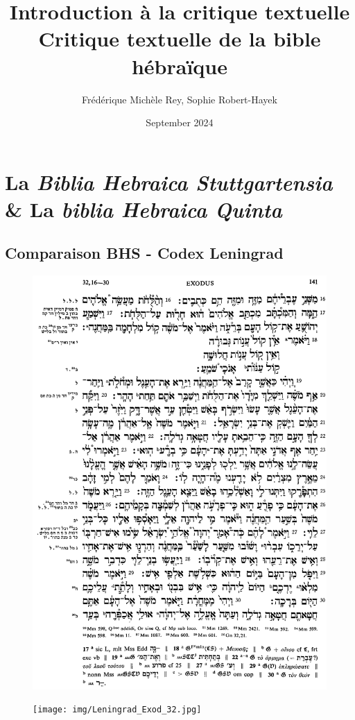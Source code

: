 \documentclass[11pt,a4paper]{article}
\title{Introduction à la critique textuelle\\Critique textuelle de la bible hébraïque}
\author{Frédérique Michèle Rey, Sophie Robert-Hayek}
\date{September 2024}
\begin{document}
\maketitle
\justifying

\section{La \textit{Biblia Hebraica Stuttgartensia} \& La \textit{biblia Hebraica Quinta}}

\subsection{Comparaison BHS - Codex Leningrad}
\begin{figure}[!h]
    \centering
\includegraphics[width=.6\linewidth]{img/BHS_Exod_32.png}
\end{figure}
\newpage
\begin{figure}[!h]
    \centering
\texttt{[image: img/Leningrad\_Exod\_32.jpg]}
\end{figure}

\newpage
\end{document}

